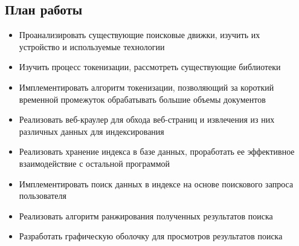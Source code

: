 \subsection{План работы}
\begin{itemize}
    \item{Проанализировать существующие поисковые движки, изучить их \\
    устройство и используемые технологии}
    \item {Изучить процесс токенизации, рассмотреть существующие библиотеки}
    \item {Имплементировать алгоритм токенизации, позволяющий за короткий временной промежуток обрабатывать большие объемы документов }
    \item {Реализовать веб-краулер для обхода веб-страниц и извлечения из них различных данных для индексирования}
    \item {Реализовать хранение индекса в базе данных, проработать ее эффективное взаимодействие с остальной программой}
    \item {Имплементировать поиск данных в индексе на основе поискового запроса пользователя }
    \item {Реализовать алгоритм ранжирования полученных результатов поиска}
    \item {Разработать графическую оболочку для просмотров результатов поиска}
  \end{itemize}